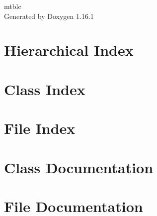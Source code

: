 \documentclass[twoside]{book}
\newcommand{\+}{\discretionary{\mbox{\scriptsize$\hookleftarrow$}}{}{}}
\newcommand{\clearemptydoublepage}{%
    \newpage{\pagestyle{empty}\cleardoublepage}%
  }
\begin{document}
  \raggedbottom
    \hypersetup{pageanchor=false,
                bookmarksnumbered=true,
                pdfencoding=unicode
               }
  \begin{titlepage}
  \vspace*{7cm}
  \begin{center}%
  {\Large mtblc}\\
  \vspace*{1cm}
  {\large Generated by Doxygen 1.16.1}\\
  \end{center}
  \end{titlepage}
  \clearemptydoublepage
  \tableofcontents
  \clearemptydoublepage
  \hypersetup{pageanchor=true}
\chapter{Hierarchical Index}

\chapter{Class Index}

\chapter{File Index}

\chapter{Class Documentation}












\chapter{File Documentation}


  \backmatter
  \newpage
  \clearemptydoublepage
  \printindex
\end{document}
